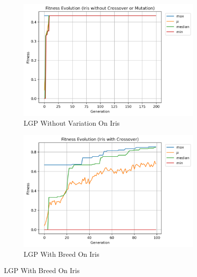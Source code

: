 \documentclass[12pt, final]{dalcsthesis}
\begin{document}
\begin{figure}
	\centering
	\begin{subfigure}[b]{0.48\textwidth}
		\includegraphics[width=\textwidth]{iris_baseline.png}
		\caption{LGP Without Variation On Iris}
		\label{fig:iris_baseline}
	\end{subfigure}
	\hfill
	\begin{subfigure}[b]{0.48\textwidth}
		\includegraphics[width=\textwidth]{iris_crossover.png}
		\caption{LGP With Breed On Iris}
		\label{fig:iris_crossover}
	\end{subfigure}

	\medskip


\end{figure}
\end{document}
